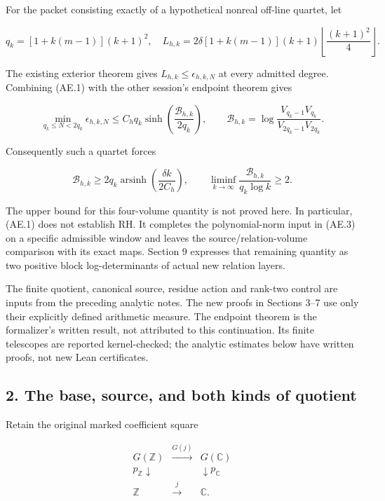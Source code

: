 For the packet consisting exactly of a hypothetical nonreal off-line
quartet, let

\[
 q_k=[1+k(m-1)](k+1)^2,
 \quad
 L_{h,k}=2\delta[1+k(m-1)](k+1)
                 \left\lfloor\frac{(k+1)^2}{4}\right\rfloor.             \tag{AE.2}\label{AE.eq.2}
\]

The existing exterior theorem gives \(L_{h,k}\le\epsilon_{h,k,N}\) at
every admitted degree. Combining (AE.1) with the other session's endpoint
theorem gives

\[
 \boxed{\min_{q_k\le N<2q_k}\epsilon_{h,k,N}
 \le C_hq_k\sinh\!\left(\frac{\mathcal B_{h,k}}{2q_k}\right),\qquad
 \mathcal B_{h,k}=\log\frac{V_{q_k-1}V_{q_k}}
                              {V_{2q_k-1}V_{2q_k}}.}                    \tag{AE.3}\label{AE.eq.3}
\]

Consequently such a quartet forces

\[
 \boxed{\mathcal B_{h,k}\ge
 2q_k\operatorname{arsinh}\!\left(\frac{\delta k}{2C_h}\right),\qquad
 \liminf_{k\to\infty}\frac{\mathcal B_{h,k}}{q_k\log k}\ge2.}           \tag{AE.4}\label{AE.eq.4}
\]

The upper bound for this four-volume quantity is not proved here. In
particular, (AE.1) does not establish RH. It completes the polynomial-norm
input in (AE.3) on a specific admissible window and leaves the
source/relation-volume comparison with its exact maps. Section 9
expresses that remaining quantity as two positive block log-determinants
of actual new relation layers.

The finite quotient, canonical source, residue action and rank-two
control are inputs from the preceding analytic notes. The new proofs in
Sections 3--7 use only their explicitly defined arithmetic measure. The
endpoint theorem is the formalizer's written result, not attributed to
this continuation. Its finite telescopes are reported kernel-checked;
the analytic estimates below have written proofs, not new Lean
certificates.

\subsection*{2. The base, source, and both kinds of
quotient}
\label{AE.the-base-source-and-both-kinds-of-quotient}

Retain the original marked coefficient square

\[
\begin{array}{ccc}
 G(\mathbb Z)&\xrightarrow{G(j)}&G(\mathbb C)\\
 p_{\mathbb Z}\downarrow&&\downarrow p_{\mathbb C}\\
 \mathbb Z&\xrightarrow{j}&\mathbb C.
\end{array}                                                          \tag{AE.5}\label{AE.eq.5}
\]

